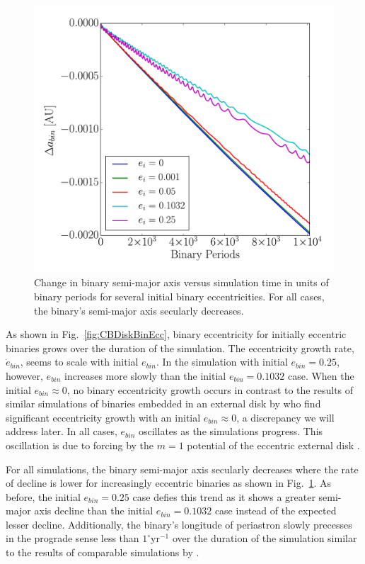 \begin{figure}
	\includegraphics[width=\columnwidth]{f7}
    \caption{Change in binary semi-major axis versus simulation time in units of binary periods for several initial binary eccentricities. For all cases, the binary's semi-major axis secularly decreases.}
    \label{fig:CBDiskBinSemi}
\end{figure}

As shown in Fig.~\ref{fig:CBDiskBinEcc}, binary eccentricity for
initially eccentric binaries grows over the duration
of the simulation.  The eccentricity growth rate, $\dot{e}_{bin}$,
seems to scale with initial $e_{bin}$.  In the simulation with initial
$e_{bin} = 0.25$, however, $e_{bin}$ increases more slowly than the
initial $e_{bin} = 0.1032$ case.  When the initial $e_{bin} \approx
0$, no binary eccentricity growth occurs in contrast to the results of
similar simulations of binaries embedded in an external disk by
\citet{Papaloizou2001,Pierens2007,Cuadra2009} who find significant
eccentricity growth with an initial $e_{bin} \approx 0$, a discrepancy
we will address later.  In all cases, $e_{bin}$ oscillates as the simulations progress.  This oscillation is due to forcing by the $m = 1$ potential of the eccentric 
external disk \citep{Artymowicz2000}.

For all simulations, the binary semi-major axis secularly decreases where the rate of decline is lower for increasingly eccentric binaries as shown in Fig.~\ref{fig:CBDiskBinSemi}.  As before, the initial $e_{bin} = 0.25$ case defies this trend as it shows a greater semi-major axis decline than the initial $e_{bin} = 0.1032$ case instead of the expected lesser decline.  Additionally, the binary's longitude of periastron slowly precesses in the prograde sense less than $1^{\circ}$yr$^{-1}$ over the duration of the simulation similar to the results of comparable simulations by \citet{Kley2015}.

